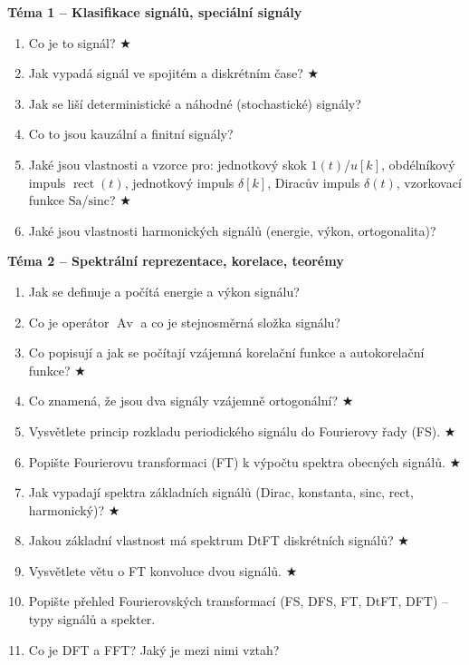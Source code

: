 \documentclass[12pt,a4paper]{article}
\newcommand{\Av}{\operatorname{Av}}
\newcommand{\rect}{\operatorname{rect}}
\begin{document}
\bigskip
\begin{tcolorbox}[colback=tmavemodr!5,colframe=tmavemodr!60,
    title={\bfseries\color{white} Kompletní seznam všech otázek ke zkoušce},
    fonttitle=\large, breakable]

\textbf{\color{tmavemodr}Téma 1 – Klasifikace signálů, speciální signály}
\begin{enumerate}[itemsep=2pt, label=\arabic*.]
  \item Co je to signál? $\bigstar$
  \item Jak vypadá signál ve spojitém a diskrétním čase? $\bigstar$
  \item Jak se liší deterministické a náhodné (stochastické) signály?
  \item Co to jsou kauzální a finitní signály?
  \item Jaké jsou vlastnosti a vzorce pro: jednotkový skok $1(t)$/$u[k]$, obdélníkový impuls $\rect(t)$, jednotkový impuls $\delta[k]$, Diracův impuls $\delta(t)$, vzorkovací funkce $\mathrm{Sa}$/$\mathrm{sinc}$? $\bigstar$
  \item Jaké jsou vlastnosti harmonických signálů (energie, výkon, ortogonalita)?
\end{enumerate}

\medskip
\textbf{\color{tmavemodr}Téma 2 – Spektrální reprezentace, korelace, teorémy}
\begin{enumerate}[resume, itemsep=2pt, label=\arabic*.]
  \item Jak se definuje a počítá energie a výkon signálu?
  \item Co je operátor $\Av$ a co je stejnosměrná složka signálu?
  \item Co popisují a jak se počítají vzájemná korelační funkce a autokorelační funkce? $\bigstar$
  \item Co znamená, že jsou dva signály vzájemně ortogonální? $\bigstar$
  \item Vysvětlete princip rozkladu periodického signálu do Fourierovy řady (FS). $\bigstar$
  \item Popište Fourierovu transformaci (FT) k výpočtu spektra obecných signálů. $\bigstar$
  \item Jak vypadají spektra základních signálů (Dirac, konstanta, sinc, rect, harmonický)? $\bigstar$
  \item Jakou základní vlastnost má spektrum DtFT diskrétních signálů? $\bigstar$
  \item Vysvětlete větu o FT konvoluce dvou signálů. $\bigstar$
  \item Popište přehled Fourierovských transformací (FS, DFS, FT, DtFT, DFT) – typy signálů a spekter.
  \item Co je DFT a FFT? Jaký je mezi nimi vztah?
\end{enumerate}


\end{tcolorbox}
\end{document}

